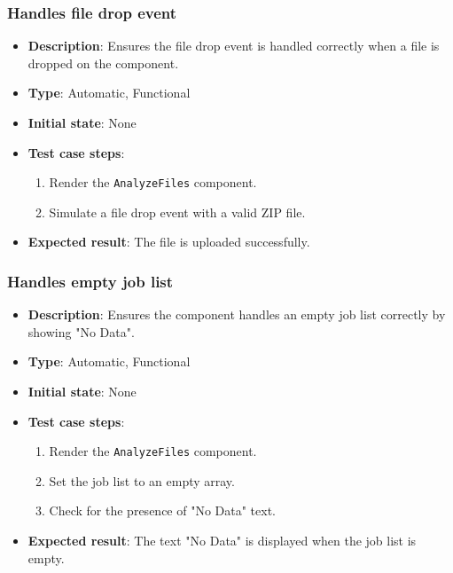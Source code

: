 \documentclass[12pt, titlepage]{article}
\begin{document}
\subsubsection{Handles file drop event}
\begin{itemize}
    \item \textbf{Description}: Ensures the file drop event is handled correctly when a file is dropped on the component.
    \item \textbf{Type}: Automatic, Functional
    \item \textbf{Initial state}: None
    \item \textbf{Test case steps}:
    \begin{enumerate}
        \item Render the \texttt{AnalyzeFiles} component.
        \item Simulate a file drop event with a valid ZIP file.
    \end{enumerate}
    \item \textbf{Expected result}: The file is uploaded successfully.
\end{itemize}

\subsubsection{Handles empty job list}
\begin{itemize}
    \item \textbf{Description}: Ensures the component handles an empty job list correctly by showing "No Data".
    \item \textbf{Type}: Automatic, Functional
    \item \textbf{Initial state}: None
    \item \textbf{Test case steps}:
    \begin{enumerate}
        \item Render the \texttt{AnalyzeFiles} component.
        \item Set the job list to an empty array.
        \item Check for the presence of "No Data" text.
    \end{enumerate}
    \item \textbf{Expected result}: The text "No Data" is displayed when the job list is empty.
\end{itemize}
\end{document}
